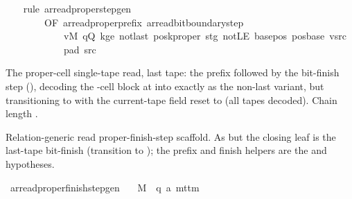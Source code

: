\begin{isabellebody}
%
\isadelimproof
\ \ %
\endisadelimproof
%
\isatagproof
{}\isamarkupfalse%
\ {\isacharparenleft}{\kern0pt}rule\ ar{\isacharunderscore}{\kern0pt}read{\isacharunderscore}{\kern0pt}proper{\isacharunderscore}{\kern0pt}step{\isacharunderscore}{\kern0pt}gen\isanewline
\ \ \ \ \ \ \ \ {\isacharbrackleft}{\kern0pt}OF\ ar{\isacharunderscore}{\kern0pt}read{\isacharunderscore}{\kern0pt}proper{\isacharunderscore}{\kern0pt}prefix\ ar{\isacharunderscore}{\kern0pt}read{\isacharunderscore}{\kern0pt}bit{\isacharunderscore}{\kern0pt}boundary{\isacharunderscore}{\kern0pt}step\isanewline
\ \ \ \ \ \ \ \ \ \ \ \ vM\ qQ\ kge{}\ notlast\ posk{\isacharunderscore}{\kern0pt}proper\ stg\ notLE\ base{\isacharunderscore}{\kern0pt}pos\ pos{\isacharunderscore}{\kern0pt}base\ vsrc\isanewline
\ \ \ \ \ \ \ \ \ \ \ \ pad{}\ src{}{\isacharbrackright}{\kern0pt}{\isacharparenright}{\kern0pt}%
\endisatagproof
{\isafoldproof}%
%
\isadelimproof
%
\endisadelimproof
%
\begin{isamarkuptext}%
The proper-cell single-tape read, last tape: the prefix
  followed by the bit-finish step (),
  decoding the -cell block at  into 
  exactly as the non-last variant, but transitioning to
   with the current-tape field reset to
   (all tapes decoded).  Chain length .%
\end{isamarkuptext}\isamarkuptrue%
%
\begin{isamarkuptext}%
Relation-generic read proper-finish-step scaffold.  As
   but the closing leaf is the last-tape
  bit-finish (transition to ); the prefix and
  finish helpers are the  and 
  hypotheses.%
\end{isamarkuptext}\isamarkuptrue%
\isamarkupfalse%
\ ar{\isacharunderscore}{\kern0pt}read{\isacharunderscore}{\kern0pt}proper{\isacharunderscore}{\kern0pt}finish{\isacharunderscore}{\kern0pt}step{\isacharunderscore}{\kern0pt}gen{\isacharcolon}{\kern0pt}\isanewline
\ \ \ M\ {\isacharcolon}{\kern0pt}{\isacharcolon}{\kern0pt}\ {\isachardoublequoteopen}{\isacharparenleft}{\kern0pt}{\isacharprime}{\kern0pt}q{\isacharcomma}{\kern0pt}\ {\isacharprime}{\kern0pt}a{\isacharparenright}{\kern0pt}\ mttm{\isachardoublequoteclose}\isanewline

\end{isabellebody}
